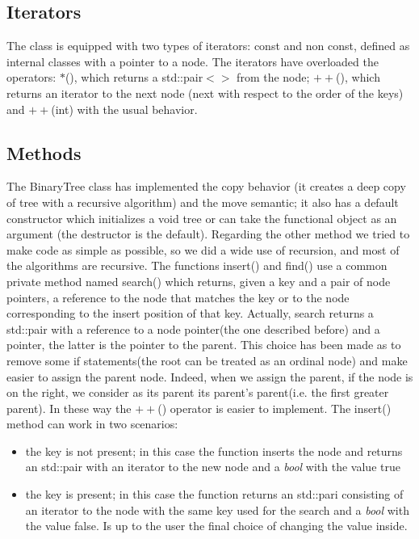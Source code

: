 \documentclass[a4paper,11pt]{article}
\begin{document}
\subsection*{Iterators}

The class is equipped with two types of iterators: const and non const, defined as internal classes with a pointer to a node. The iterators have overloaded the operators: $*$(), which returns a std::pair$<>$ from the node; $++$(), which returns an iterator to the next node (next with respect to the order of the keys) and $++$(int) with the usual behavior. 

\subsection*{Methods}

The BinaryTree class has implemented the copy behavior (it creates a deep copy of tree with a recursive algorithm) and the move semantic; it also has a default constructor which initializes a void tree or can take the functional object as an argument (the destructor is the default). Regarding the other method we tried to make code as simple as possible, so we did a wide use of recursion, and most of the algorithms are recursive. The functions insert() and find() use a common private method named search() which returns, given a key and a pair of node pointers, a reference to the node that matches the key or to the node corresponding to the insert position of that key. Actually, search returns a std::pair with a reference to a node pointer(the one described before) and a pointer, the latter is the pointer to the parent. This choice has been made as to remove some if statements(the root can be treated as an ordinal node) and make easier to assign the parent node. Indeed, when we assign the parent, if the node is on the right, we consider as its parent its parent's parent(i.e. the first greater parent). In these way the $++$() operator is easier to implement. The insert() method can work in two scenarios: 
\begin{itemize}
	\item the key is not present; in this case the function inserts the node and returns an std::pair with an iterator to the new node and a \emph{bool} with the value true
	\item the key is present; in this case the function returns an std::pari consisting of an iterator to the node with the same key used for the search and a \emph{bool} with the value false. Is up to the user the final choice of changing the value inside.
\end{itemize}
\end{document}
